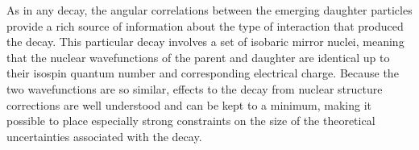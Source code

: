 As in any decay, the angular correlations between the emerging daughter particles provide a rich source of information about the type of interaction that produced the decay.  
This particular decay involves a set of isobaric mirror nuclei, meaning that the nuclear wavefunctions of the parent and daughter are identical up to their isospin quantum number and corresponding electrical charge.  Because the two wavefunctions are so similar, effects to the decay from nuclear structure corrections are well understood and can be kept to a minimum, making it possible to place especially strong constraints on the size of the theoretical uncertainties associated with the decay.










